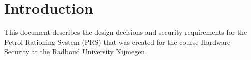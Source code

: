 
\section{Introduction}
\label{introduction}
This document describes the design decisions and security requirements for the Petrol Rationing System (PRS) that was created for the course Hardware Security at the Radboud University Nijmegen. 

